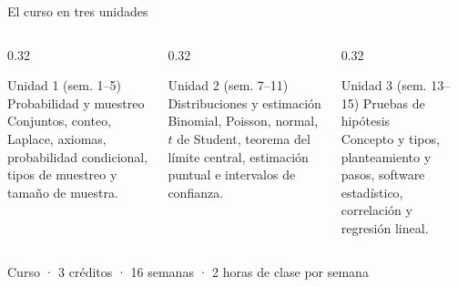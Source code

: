 \documentclass[aspectratio=169,10pt]{beamer}
\begin{document}
\begin{frame}{El curso en tres unidades}
  \begin{columns}[T,onlytextwidth]
    \begin{column}{0.32\textwidth}
      \begin{block}{Unidad 1 (sem. 1--5)}
        \small Probabilidad y muestreo\\[0.2em]
        Conjuntos, conteo, Laplace, axiomas, probabilidad condicional,
        tipos de muestreo y tamaño de muestra.
      \end{block}
    \end{column}
    \begin{column}{0.32\textwidth}
      \begin{block}{Unidad 2 (sem. 7--11)}
        \small Distribuciones y estimación\\[0.2em]
        Binomial, Poisson, normal, $t$ de Student, teorema del límite central,
        estimación puntual e intervalos de confianza.
      \end{block}
    \end{column}
    \begin{column}{0.32\textwidth}
      \begin{block}{Unidad 3 (sem. 13--15)}
        \small Pruebas de hipótesis\\[0.2em]
        Concepto y tipos, planteamiento y pasos, software estadístico,
        correlación y regresión lineal.
      \end{block}
    \end{column}
  \end{columns}

  \vspace{0.45cm}
  \begin{center}
    \small Curso  · 3 créditos · 16 semanas ·
    2 horas de clase por semana
  \end{center}
\end{frame}
\end{document}
